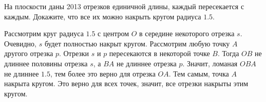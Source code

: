 \problem
На плоскости даны 2013 отрезков единичной длины, каждый пересекается с каждым.
Докажите, что все их можно накрыть кругом радиуса $1.5$.

\solution
Рассмотрим круг радиуса $1.5$ с центром $O$ в середине некоторого отрезка $s$.
Очевидно, $s$ будет полностью накрыт кругом.
Рассмотрим любую точку $A$ другого отрезка $p$.
Отрезки $s$ и $p$ пересекаются в некоторой точке $B$.
Тогда $OB$ не длиннее половины отрезка $s$, а $BA$ не длиннее отрезка $p$.
Значит, ломаная $OBA$ не длиннее $1.5$, тем более это верно для отрезка $OA$.
Тем самым, точка $A$ накрыта кругом.
Это верно для всех точек, значит, все отрезки накрыты этим кругом.
\endproblem
